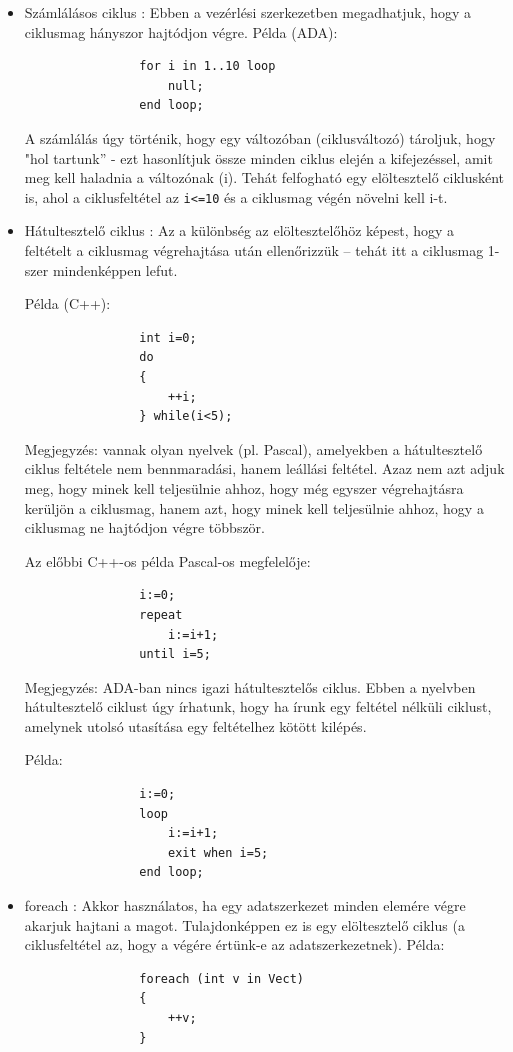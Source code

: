 \documentclass[margin=0px]{article}
\begin{document}
\begin{itemize}
\begin{itemize}
			\item	Számlálásos ciklus : Ebben a vezérlési szerkezetben megadhatjuk, hogy a ciklusmag hányszor
			hajtódjon végre.
			Példa (ADA): 
			\begin{verbatim}
				for i in 1..10 loop 
				    null;
				end loop;
			\end{verbatim}
			A számlálás úgy történik, hogy egy változóban (ciklusváltozó) tároljuk, hogy "hol tartunk” - ezt hasonlítjuk
			össze minden ciklus elején a kifejezéssel, amit meg kell haladnia a változónak (i). Tehát
			felfogható egy elöltesztelő ciklusként is, ahol a ciklusfeltétel az \texttt{i<=10} és a ciklusmag végén
			növelni kell i-t.
			
			\item	Hátultesztelő ciklus : Az a különbség az elöltesztelőhöz képest, hogy a feltételt a ciklusmag
			végrehajtása után ellenőrizzük – tehát itt a ciklusmag 1-szer mindenképpen lefut.
			
			Példa (C++):
			
			\begin{verbatim}
				int i=0;
				do
				{
				    ++i;
				} while(i<5);
			\end{verbatim}
			
			Megjegyzés: vannak olyan nyelvek (pl. Pascal), amelyekben a hátultesztelő ciklus feltétele nem bennmaradási, hanem
			leállási feltétel. Azaz nem azt adjuk meg, hogy minek kell teljesülnie ahhoz, hogy még egyszer végrehajtásra kerüljön
			a ciklusmag, hanem azt, hogy minek kell teljesülnie ahhoz, hogy a ciklusmag ne hajtódjon végre többször.
			
			Az előbbi C++-os példa Pascal-os megfelelője:
			\begin{verbatim}
				i:=0;
				repeat
				    i:=i+1;
				until i=5;
			\end{verbatim}
			
			Megjegyzés: ADA-ban nincs igazi hátultesztelős ciklus. Ebben a nyelvben hátultesztelő ciklust úgy írhatunk, hogy ha
			írunk egy feltétel nélküli ciklust, amelynek utolsó utasítása egy feltételhez kötött kilépés.
			
			Példa:
			\begin{verbatim}
				i:=0;
				loop
				    i:=i+1;
				    exit when i=5;
				end loop;
			\end{verbatim}
			

			\item	foreach : Akkor használatos, ha egy adatszerkezet minden elemére végre akarjuk hajtani a magot.
			Tulajdonképpen ez is egy elöltesztelő ciklus (a ciklusfeltétel az, hogy a végére értünk-e az
			adatszerkezetnek).
			Példa: 
			\begin{verbatim}
				foreach (int v in Vect)
				{
				    ++v;
				}
			\end{verbatim}
			

\end{itemize}
\end{itemize}
\end{document}
